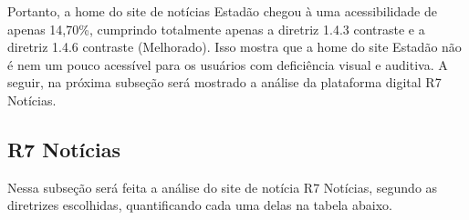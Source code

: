 \documentclass[a4paper]{article}
\begin{document}
\begin{titlepage}
Portanto, a home do site de notícias Estadão chegou à uma acessibilidade de apenas 14,70\%, cumprindo totalmente apenas a diretriz 1.4.3 contraste e a diretriz 1.4.6 contraste (Melhorado). Isso mostra que a home do site Estadão não é nem um pouco acessível para os usuários com deficiência visual e auditiva. A seguir, na próxima subseção será mostrado a análise da plataforma digital R7 Notícias.

\subsection{R7 Notícias}

Nessa subseção será feita a análise do site de notícia R7 Notícias, segundo as diretrizes escolhidas, quantificando cada uma delas na tabela abaixo.\\


\end{titlepage}
\end{document}
